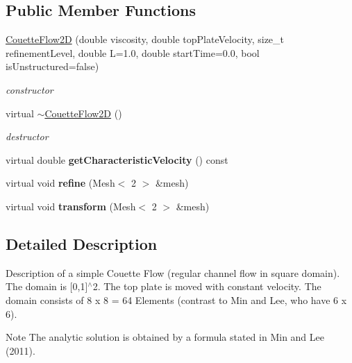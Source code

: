 \subsection*{Public Member Functions}
\begin{DoxyCompactItemize}
\item 
\hyperlink{classnatrium_1_1CouetteFlow2D_a94e51b7eaff3998383f1d7dc07b994cb}{CouetteFlow2D} (double viscosity, double topPlateVelocity, size\_\-t refinementLevel, double L=1.0, double startTime=0.0, bool isUnstructured=false)
\begin{DoxyCompactList}\small\item\em constructor \item\end{DoxyCompactList}\item 
\hypertarget{classnatrium_1_1CouetteFlow2D_a97b61b0f71dc653427ba3db46e185873}{
virtual \hyperlink{classnatrium_1_1CouetteFlow2D_a97b61b0f71dc653427ba3db46e185873}{$\sim$CouetteFlow2D} ()}
\label{classnatrium_1_1CouetteFlow2D_a97b61b0f71dc653427ba3db46e185873}

\begin{DoxyCompactList}\small\item\em destructor \item\end{DoxyCompactList}\item 
\hypertarget{classnatrium_1_1CouetteFlow2D_a74429d98c455a0c06430a665505d8375}{
virtual double {\bfseries getCharacteristicVelocity} () const }
\label{classnatrium_1_1CouetteFlow2D_a74429d98c455a0c06430a665505d8375}

\item 
\hypertarget{classnatrium_1_1CouetteFlow2D_a4f2b1f26f932fec2815bfb08385ee20d}{
virtual void {\bfseries refine} (Mesh$<$ 2 $>$ \&mesh)}
\label{classnatrium_1_1CouetteFlow2D_a4f2b1f26f932fec2815bfb08385ee20d}

\item 
\hypertarget{classnatrium_1_1CouetteFlow2D_a1f6ae268733802c9dc2e8ff29f23a7f8}{
virtual void {\bfseries transform} (Mesh$<$ 2 $>$ \&mesh)}
\label{classnatrium_1_1CouetteFlow2D_a1f6ae268733802c9dc2e8ff29f23a7f8}

\end{DoxyCompactItemize}


\subsection{Detailed Description}
Description of a simple Couette Flow (regular channel flow in square domain). The domain is \mbox{[}0,1\mbox{]}$^\wedge$2. The top plate is moved with constant velocity. The domain consists of 8 x 8 = 64 Elements (contrast to Min and Lee, who have 6 x 6). \begin{DoxyNote}{Note}
The analytic solution is obtained by a formula stated in Min and Lee (2011). 
\end{DoxyNote}


